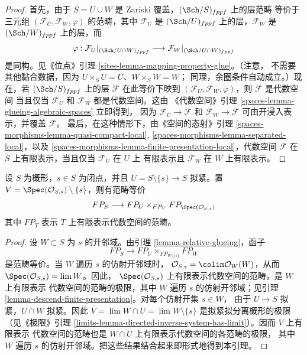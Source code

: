 \begin{proof}
首先，由于 $S = U \cup W$ 是 Zariski 覆盖，$(\Sch/S)_{fppf}$ 上的层范畴
等价于三元组 $(\mathcal{F}_U, \mathcal{F}_W, \varphi)$ 的范畴，其中
$\mathcal{F}_U$ 是 $(\Sch/U)_{fppf}$ 上的层，$\mathcal{F}_W$ 是
$(\Sch/W)_{fppf}$ 上的层，而
$$
\varphi :
\mathcal{F}_U|_{(\Sch/U \cap W)_{fppf}}
\longrightarrow
\mathcal{F}_W|_{(\Sch/U \cap W)_{fppf}}
$$
是同构。见《位点》引理 \ref{sites-lemma-mapping-property-glue}。（注意，
不需要其他黏合数据，因为 $U \times_S U = U$、$W \times_S W = W$；
同理，余圈条件自动成立。）现在，若 $(\Sch/S)_{fppf}$ 上的层
$\mathcal{F}$ 在此等价下映到
$(\mathcal{F}_U, \mathcal{F}_W, \varphi)$，则 $\mathcal{F}$ 是代数空间
当且仅当 $\mathcal{F}_U$ 和 $\mathcal{F}_W$ 都是代数空间。这由
《代数空间》引理 \ref{spaces-lemma-glueing-algebraic-spaces} 立即得到，
因为 $\mathcal{F}_U \to \mathcal{F}$ 和
$\mathcal{F}_W \to \mathcal{F}$ 可由开浸入表示，并覆盖 $\mathcal{F}$。
最后，在这种情形下，由《空间的态射》引理
\ref{spaces-morphisms-lemma-quasi-compact-local},
\ref{spaces-morphisms-lemma-separated-local}，以及
\ref{spaces-morphisms-lemma-finite-presentation-local}，代数空间
$\mathcal{F}$ 在 $S$ 上有限表示，当且仅当 $\mathcal{F}_U$ 在 $U$ 上
有限表示且 $\mathcal{F}_W$ 在 $W$ 上有限表示。
\end{proof}

\begin{lemma}
\label{lemma-glueing-near-closed-point}
设 $S$ 为概形，$s \in S$ 为闭点，并且
$U = S \setminus \{s\} \to S$ 拟紧。置
$V = \Spec(\mathcal{O}_{S, s}) \setminus \{s\}$，则有范畴等价
$$
FP_S \longrightarrow FP_U \times_{FP_V} FP_{\Spec(\mathcal{O}_{S, s})}
$$
其中 $FP_T$ 表示 $T$ 上有限表示代数空间的范畴。
\end{lemma}

\begin{proof}
设 $W \subset S$ 为 $s$ 的开邻域。由引理 \ref{lemma-relative-glueing}，函子
$$
FP_S \to FP_U \times_{FP_{W \setminus \{s\}}} FP_W
$$
是范畴等价。当 $W$ 遍历 $s$ 的仿射开邻域时，
$\mathcal{O}_{S, s} = \colim \mathcal{O}_W(W)$，从而
$\Spec(\mathcal{O}_{S, s}) = \lim W$。因此，
$\Spec(\mathcal{O}_{S, s})$ 上有限表示代数空间的范畴，是 $W$ 上有限表示
代数空间的范畴的极限，其中 $W$ 遍历 $s$ 的仿射开邻域；见引理
\ref{lemma-descend-finite-presentation}。对每个仿射开集 $s \in W$，
由于 $U \to S$ 拟紧，$U \cap W$ 拟紧。因此
$V = \lim W \cap U = \lim W \setminus \{s\}$ 是拟紧拟分离概形的极限
（见《极限》引理
\ref{limits-lemma-directed-inverse-system-has-limit}）。因而 $V$ 上有限表示
代数空间的范畴也是 $W \cap U$ 上有限表示代数空间的各范畴的极限，
其中 $W$ 遍历 $s$ 的仿射开邻域。把这些结果结合起来即形式地得到本引理。
\end{proof}

